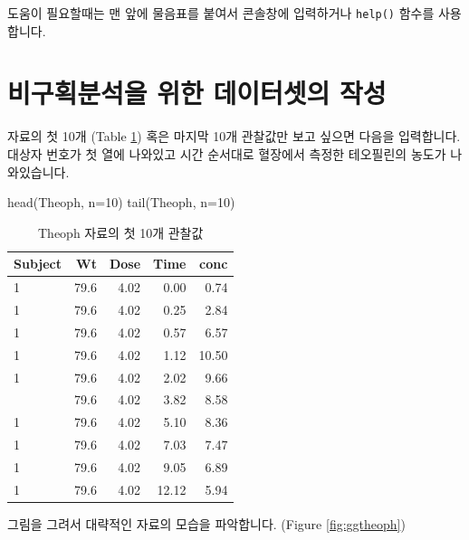 \documentclass[
  11pt,
  krantz2, a4paper, twoside]{krantz}
\newenvironment{Shaded}{\begin{snugshade}}{\end{snugshade}}
\newcommand{\AttributeTok}[1]{\textcolor[rgb]{0.77,0.63,0.00}{#1}}
\newcommand{\DecValTok}[1]{\textcolor[rgb]{0.00,0.00,0.81}{#1}}
\newcommand{\FunctionTok}[1]{\textcolor[rgb]{0.00,0.00,0.00}{#1}}
\newcommand{\NormalTok}[1]{#1}
\begin{document}
도움이 필요할때는 맨 앞에 물음표를 붙여서 콘솔창에 입력하거나 \texttt{help()} 함수를 사용합니다.

\hypertarget{uxbe44uxad6cuxd68duxbd84uxc11duxc744-uxc704uxd55c-uxb370uxc774uxd130uxc14buxc758-uxc791uxc131}{%
\section{비구획분석을 위한 데이터셋의 작성}\label{uxbe44uxad6cuxd68duxbd84uxc11duxc744-uxc704uxd55c-uxb370uxc774uxd130uxc14buxc758-uxc791uxc131}}

자료의 첫 10개 (Table \ref{tab:head}) 혹은 마지막 10개 관찰값만 보고 싶으면 다음을 입력합니다.
대상자 번호가 첫 열에 나와있고 시간 순서대로 혈장에서 측정한 테오필린의 농도가 나와있습니다.

\begin{Shaded}
\begin{Highlighting}[]
\FunctionTok{head}\NormalTok{(Theoph, }\AttributeTok{n=}\DecValTok{10}\NormalTok{)}
\FunctionTok{tail}\NormalTok{(Theoph, }\AttributeTok{n=}\DecValTok{10}\NormalTok{)}
\end{Highlighting}
\end{Shaded}

\begin{table}

\caption{\label{tab:head}Theoph 자료의 첫 10개 관찰값}
\centering
\begin{tabular}[t]{lrrrr}
\toprule
Subject & Wt & Dose & Time & conc\\
\midrule
1 & 79.6 & 4.02 & 0.00 & 0.74\\
1 & 79.6 & 4.02 & 0.25 & 2.84\\
1 & 79.6 & 4.02 & 0.57 & 6.57\\
1 & 79.6 & 4.02 & 1.12 & 10.50\\
1 & 79.6 & 4.02 & 2.02 & 9.66\\
\addlinespace
1 & 79.6 & 4.02 & 3.82 & 8.58\\
1 & 79.6 & 4.02 & 5.10 & 8.36\\
1 & 79.6 & 4.02 & 7.03 & 7.47\\
1 & 79.6 & 4.02 & 9.05 & 6.89\\
1 & 79.6 & 4.02 & 12.12 & 5.94\\
\bottomrule
\end{tabular}
\end{table}

그림을 그려서 대략적인 자료의 모습을 파악합니다. (Figure \ref{fig:ggtheoph})
\end{document}
